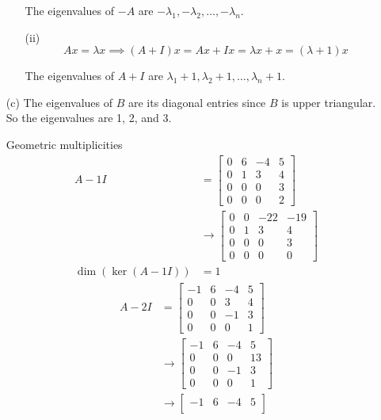 \documentclass{article}
\begin{document}
\begin{enumerate}
\begin{enumerate}
    The eigenvalues of \( -A \) are \( -\lambda_1, -\lambda_2, \dotsc,
    -\lambda_n \).

    \item[(ii)]
    \[ Ax = \lambda x \implies (A + I)x = Ax + Ix = \lambda x + x = (\lambda +
    1)x \]

    The eigenvalues of \( A + I \) are \( \lambda_1 + 1, \lambda_2 + 1, \dotsc,
    \lambda_n + 1 \).
  \end{enumerate}

  \item[(c)]
  The eigenvalues of \( B \) are its diagonal entries since \( B \) is upper
  triangular. So the eigenvalues are 1, 2, and 3.

  Geometric multiplicities
  \begin{align*}
    A - 1I &=
    \begin{bmatrix}
      0 & 6 & -4 & 5 \\
      0 & 1 & 3 & 4 \\
      0 & 0 & 0 & 3 \\
      0 & 0 & 0 & 2
    \end{bmatrix} \\
    &\rightarrow
    \begin{bmatrix}
      0 & 0 & -22 & -19 \\
      0 & 1 & 3 & 4 \\
      0 & 0 & 0 & 3 \\
      0 & 0 & 0 & 0
    \end{bmatrix} \\
    \dim(\ker(A - 1I)) &= 1
  \end{align*}
  \begin{align*}
    A - 2I &=
    \begin{bmatrix}
      -1 & 6 & -4 & 5 \\
      0 & 0 & 3 & 4 \\
      0 & 0 & -1 & 3 \\
      0 & 0 & 0 & 1
    \end{bmatrix} \\
    &\rightarrow
    \begin{bmatrix}
      -1 & 6 & -4 & 5 \\
      0 & 0 & 0 & 13 \\
      0 & 0 & -1 & 3 \\
      0 & 0 & 0 & 1
    \end{bmatrix} \\
    &\rightarrow
    \begin{bmatrix}
      -1 & 6 & -4 & 5 \\

\end{bmatrix}
\end{align*}
\end{enumerate}
\end{document}
